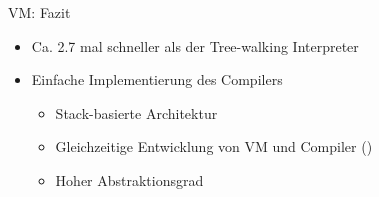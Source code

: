 \begin{frame}{VM: Fazit}
	\begin{itemize}
		\item<1-> Ca. 2.7 mal schneller als der Tree-walking Interpreter
		\item<2-> Einfache Implementierung des Compilers
		      \begin{itemize}
			      \item<3-> Stack-basierte Architektur
                  \item<4-> Gleichzeitige Entwicklung von VM und Compiler ()
			      \item<5-> Hoher Abstraktionsgrad
		      \end{itemize}
	\end{itemize}
\end{frame}
